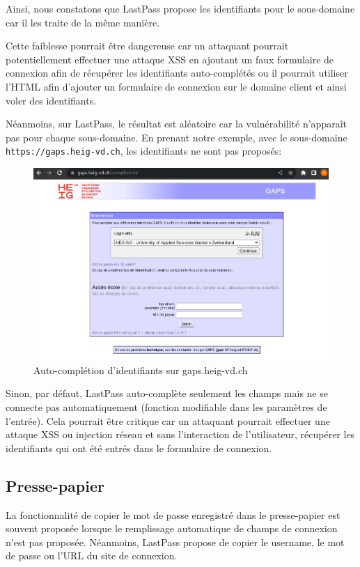 Ainsi, nous constatons que LastPass propose les identifiants pour le sous-domaine car il les traite de la même manière.

Cette faiblesse pourrait être dangereuse car un attaquant pourrait potentiellement effectuer une attaque XSS en ajoutant un faux formulaire de connexion afin de récupérer les identifiants auto-complétés ou il pourrait utiliser l'HTML afin d'ajouter un formulaire de connexion sur le domaine client et ainsi voler des identifiants.

Néanmoins, sur LastPass, le résultat est aléatoire car la vulnérabilité n'apparaît pas pour chaque sous-domaine. En prenant notre exemple, avec le sous-domaine \verb|https://gaps.heig-vd.ch|, les identifiants ne sont pas proposés:

\begin{figure}[H]
	\centering
	\includegraphics[width=15.5cm]{images/lp_gaps.png}
	\caption{Auto-complétion d'identifiants sur gaps.heig-vd.ch}
\end{figure}

Sinon, par défaut, LastPass auto-complète seulement les champs mais ne se connecte pas automatiquement (fonction modifiable dans les paramètres de l'entrée). Cela pourrait être critique car un attaquant pourrait effectuer une attaque XSS ou injection réseau et sans l'interaction de l'utilisateur, récupérer les identifiants qui ont été entrés dans le formulaire de connexion.

\subsection{Presse-papier}
La fonctionnalité de copier le mot de passe enregistré dans le presse-papier est souvent proposée lorsque le remplissage automatique de champs de connexion n'est pas proposée. Néanmoins, LastPass propose de copier le username, le mot de passe ou l'URL du site de connexion. 

